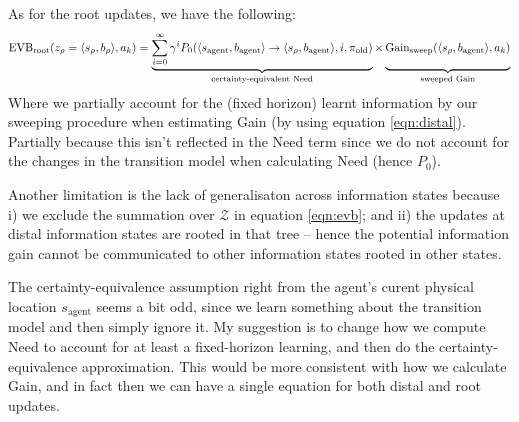 \documentclass{article}
\newcommand{\old}{\text{old}}
\begin{document}
As for the root updates, we have the following:
\begin{equation}
    \label{eqn:root}
    \text{EVB}_{\text{root}}(z_\rho=\langle s_\rho, b_\rho \rangle, a_k) = \underbrace{\sum_{i=0}^{\infty} \gamma^i P_0(\langle s_{\text{agent}}, b_{\text{agent}} \rangle \rightarrow \langle s_\rho, b_{\text{agent}} \rangle, i, \pi_{\old})}_{\text{certainty-equivalent Need}} \times \underbrace{\text{Gain}_{\text{sweep}}(\langle s_\rho, b_{\text{agent}} \rangle, a_k) \vphantom{\sum_{i=0}^{\infty}}}_{\text{sweeped Gain}}
\end{equation}
Where we partially account for the (fixed horizon) learnt information by our sweeping procedure when estimating Gain (by using equation \ref{eqn:distal}). 
Partially because this isn't reflected in the Need term since we do not account for the changes in the transition model when calculating Need (hence $P_0$).

\bigbreak

Another limitation is the lack of generalisaton across information states because i) we exclude the summation over $\mathcal{Z}$ in equation \ref{eqn:evb}; and 
ii) the updates at distal information states are rooted in that tree -- hence the potential information gain cannot be communicated to other information states rooted 
in other states. 

\bigbreak

The certainty-equivalence assumption right from the agent's curent physical location $s_\text{agent}$ seems a bit odd, since we learn something about 
the transition model and then simply ignore it. My suggestion is to change how we compute Need to account for at least a fixed-horizon learning, and 
then do the certainty-equivalence approximation. This would be more consistent with how we calculate Gain, and in fact then we can have a single equation 
for both distal and root updates.

\bigbreak
\end{document}
